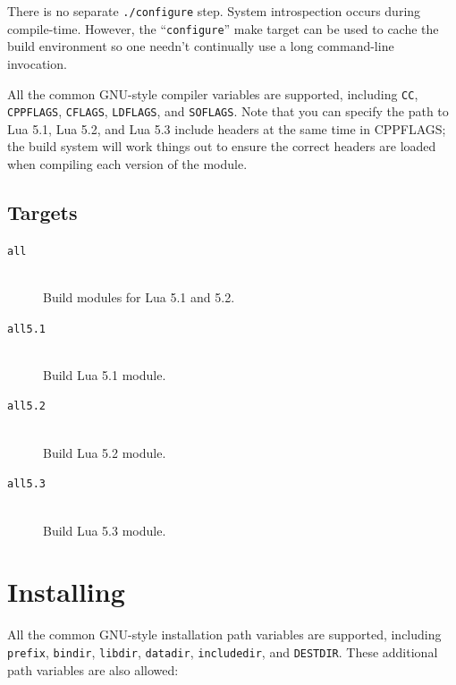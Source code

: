 \documentclass[11pt, oneside]{memoir}
\begin{document}
There is no separate \texttt{./configure} step. System introspection occurs during compile-time. However, the ``\texttt{configure}'' make target can be used to cache the build environment so one needn't continually use a long command-line invocation.

All the common GNU-style compiler variables are supported, including \texttt{CC}, \texttt{CPPFLAGS}, \texttt{CFLAGS}, \texttt{LDFLAGS}, and \texttt{SOFLAGS}. Note that you can specify the path to Lua 5.1, Lua 5.2, and Lua 5.3 include headers at the same time in CPPFLAGS; the build system will work things out to ensure the correct headers are loaded when compiling each version of the module.

\subsection{Targets}

\begin{description}
\item[\texttt{all}] \hfill \\
Build modules for Lua 5.1 and 5.2.

\item[\texttt{all5.1}] \hfill \\
Build Lua 5.1 module.

\item[\texttt{all5.2}] \hfill \\
Build Lua 5.2 module.

\item[\texttt{all5.3}] \hfill \\
Build Lua 5.3 module.

\end{description}

\section{Installing}

All the common GNU-style installation path variables are supported, including \texttt{prefix}, \texttt{bindir}, \texttt{libdir}, \texttt{datadir}, \texttt{includedir}, and \texttt{DESTDIR}. These additional path variables are also allowed:
\end{document}
